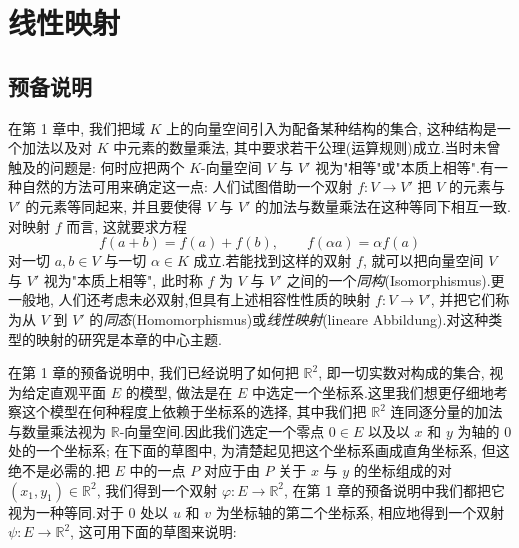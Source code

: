 \chapter{线性映射}

\section*{预备说明}

在第 1 章中, 我们把域 $K$ 上的向量空间引入为配备某种结构的集合, 这种结构是一个加法以及对 $K$ 中元素的数量乘法, 其中要求若干公理(运算规则)成立.当时未曾触及的问题是: 何时应把两个 $K$-向量空间 $V$ 与 $V'$ 视为"相等"或"本质上相等".有一种自然的方法可用来确定这一点: 人们试图借助一个双射 $f \colon V \longrightarrow V'$ 把 $V$ 的元素与 $V'$ 的元素等同起来, 并且要使得 $V$ 与 $V'$ 的加法与数量乘法在这种等同下相互一致.对映射 $f$ 而言, 这就要求方程
\[
f(a + b) = f(a) + f(b), \qquad f(\alpha a) = \alpha f(a)
\]
对一切 $a, b \in V$ 与一切 $\alpha \in K$ 成立.若能找到这样的双射 $f$, 就可以把向量空间 $V$ 与 $V'$ 视为"本质上相等", 此时称 $f$ 为 $V$ 与 $V'$ 之间的一个\emph{同构}(\textup{Isomorphismus}).更一般地, 人们还考虑未必双射,但具有上述相容性性质的映射 $f \colon V \longrightarrow V'$, 并把它们称为从 $V$ 到 $V'$ 的\emph{同态}(\textup{Homomorphismus})或\emph{线性映射}(\textup{lineare Abbildung}).对这种类型的映射的研究是本章的中心主题.

在第 1 章的预备说明中, 我们已经说明了如何把 $\mathbb{R}^2$, 即一切实数对构成的集合, 视为给定直观平面 $E$ 的模型, 做法是在 $E$ 中选定一个坐标系.这里我们想更仔细地考察这个模型在何种程度上依赖于坐标系的选择, 其中我们把 $\mathbb{R}^2$ 连同逐分量的加法与数量乘法视为 $\mathbb{R}$-向量空间.因此我们选定一个零点 $0 \in E$ 以及以 $x$ 和 $y$ 为轴的 $0$ 处的一个坐标系; 在下面的草图中, 为清楚起见把这个坐标系画成直角坐标系, 但这绝不是必需的.把 $E$ 中的一点 $P$ 对应于由 $P$ 关于 $x$ 与 $y$ 的坐标组成的对 $(x_1, y_1) \in \mathbb{R}^2$, 我们得到一个双射 $\varphi \colon E \longrightarrow \mathbb{R}^2$, 在第 1 章的预备说明中我们都把它视为一种等同.对于 $0$ 处以 $u$ 和 $v$ 为坐标轴的第二个坐标系, 相应地得到一个双射 $\psi \colon E \longrightarrow \mathbb{R}^2$, 这可用下面的草图来说明:

